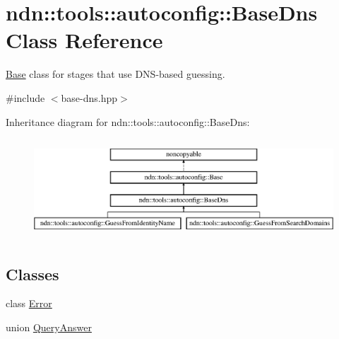 \hypertarget{classndn_1_1tools_1_1autoconfig_1_1BaseDns}{}\section{ndn\+:\+:tools\+:\+:autoconfig\+:\+:Base\+Dns Class Reference}
\label{classndn_1_1tools_1_1autoconfig_1_1BaseDns}


\hyperlink{classndn_1_1tools_1_1autoconfig_1_1Base}{Base} class for stages that use D\+N\+S-\/based guessing.  




{\ttfamily \#include $<$base-\/dns.\+hpp$>$}

Inheritance diagram for ndn\+:\+:tools\+:\+:autoconfig\+:\+:Base\+Dns\+:\begin{figure}[H]
\begin{center}
\leavevmode
\includegraphics[height=3.771044cm]{classndn_1_1tools_1_1autoconfig_1_1BaseDns}
\end{center}
\end{figure}
\subsection*{Classes}
\begin{DoxyCompactItemize}
\item 
class \hyperlink{classndn_1_1tools_1_1autoconfig_1_1BaseDns_1_1Error}{Error}
\item 
union \hyperlink{unionndn_1_1tools_1_1autoconfig_1_1BaseDns_1_1QueryAnswer}{Query\+Answer}
\end{DoxyCompactItemize}
